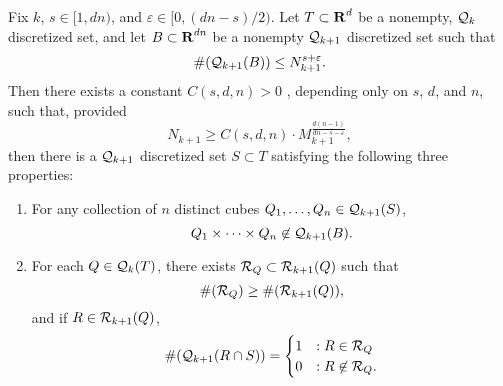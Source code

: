 \begin{lemma} \label{discretelemma}
	Fix $k$, $s \in [1,dn)$, and $\varepsilon \in [0,(dn-s)/2)$. Let $T \subset \operatorname{\mathbf{R}}^d$ be a nonempty, $\operatorname{\mathcal{Q}}_k$ discretized set, and let $B \subset \operatorname{\mathbf{R}}^{dn}$ be a nonempty $\operatorname{\mathcal{Q}}_{k+1}$ discretized set such that
	\[ \#(\operatorname{\mathcal{Q}}_{k+1}(B)) \leq N_{k+1}^{s + \varepsilon}. \]
	Then there exists a constant $C(s,d,n) > 0$%
	, depending only on $s$, $d$, and $n$, such that, provided
	\begin{equation} \label{rBound}
		N_{k+1} \geq C(s,d,n) \cdot M_{k+1}^{\frac{d(n-1)}{dn - s - \varepsilon}},
	\end{equation}
	then there is a $\operatorname{\mathcal{Q}}_{k+1}$ discretized set $S \subset T$ satisfying the following three properties:
	\begin{enumerate}
		\item\label{avoidanceItem} For any collection of $n$ distinct cubes $Q_1, \dots, Q_n \in \operatorname{\mathcal{Q}}_{k+1}(S)$,
		\[ Q_1 \times \dots \times Q_n \not \in \operatorname{\mathcal{Q}}_{k+1}(B). \]

		\item\label{nonConcentrationItem} For each $Q \in \operatorname{\mathcal{Q}}_k(T)$, there exists $\mathcal{R}_Q \subset \operatorname{\mathcal{R}}_{k+1}(Q)$ such that
		\[ \#(\mathcal{R}_Q) \geq \#(\operatorname{\mathcal{R}}_{k+1}(Q)), \]
		and if $R \in \operatorname{\mathcal{R}}_{k+1}(Q)$,
		\[ \#(\operatorname{\mathcal{Q}}_{k+1}(R \cap S)) = \begin{cases} 1 & : R \in \mathcal{R}_Q \\ 0 & : R \not \in \mathcal{R}_Q. \end{cases} \]
	\end{enumerate}
\end{lemma}

